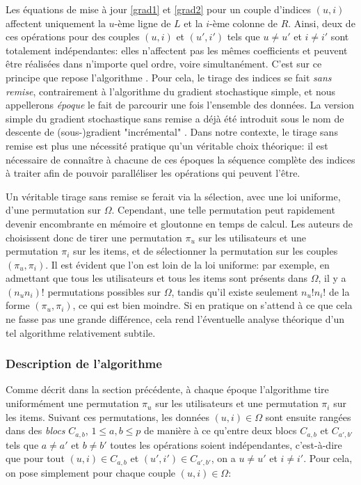 \documentclass[10pt,a4paper]{article}
\begin{document}
Les équations de mise à jour \eqref{grad1} et \eqref{grad2} pour un couple d'indices $(u,i)$ affectent uniquement la $u$-ème ligne de $L$ et la $i$-ème colonne de $R$. Ainsi, deux de ces opérations pour des couples $(u,i)$ et $(u',i')$ tels que $u \neq u'$ et $i \neq i'$ sont totalement indépendantes: elles n'affectent pas les mêmes coefficients et peuvent être réalisées dans n'importe quel ordre, voire simultanément. C'est sur ce principe que repose l'algorithme \jel \cite{jelly}. Pour cela, le tirage des indices se fait \emph{sans remise}, contrairement à l'algorithme du gradient stochastique simple, et nous appellerons \emph{époque} le fait de parcourir une fois l'ensemble des données. La version simple du gradient stochastique sans remise a déjà été introduit sous le nom de descente de (sous-)gradient "incrémental" \cite{nedic_base}. Dans notre contexte, le tirage sans remise est plus une nécessité pratique qu'un véritable choix théorique: il est nécessaire de connaître à chacune de ces époques la séquence complète des indices à traiter afin de pouvoir paralléliser les opérations qui peuvent l'être.

Un véritable tirage sans remise se ferait via la sélection, avec une loi uniforme, d'une permutation sur $\Omega$. Cependant, une telle permutation peut rapidement devenir encombrante en mémoire et gloutonne en temps de calcul. Les auteurs de \jel  choisissent donc de tirer une permutation $\pi_u$ sur les utilisateurs et une permutation $\pi_i$ sur les items, et de sélectionner la permutation sur les couples $(\pi_u,\pi_i)$. Il est évident que l'on est loin de la loi uniforme: par exemple, en admettant que tous les utilisateurs et tous les items sont présents dans $\Omega$, il y a $(n_un_i)!$ permutations possibles sur $\Omega$, tandis qu'il existe seulement $n_u!n_i!$ de la forme $(\pi_u,\pi_i)$, ce qui est bien moindre. Si en pratique on s'attend à ce que cela ne fasse pas une grande différence, cela rend l'éventuelle analyse théorique d'un tel algorithme relativement subtile.

\subsubsection*{Description de l'algorithme}

Comme décrit dans la section précédente, à chaque époque l'algorithme tire uniformément une permutation $\pi_u$ sur les utilisateurs et une permutation $\pi_i$ sur les items. Suivant ces permutations, les données $(u,i) \in \Omega$ sont ensuite rangées dans des \emph{blocs} $C_{a,b}$, $1 \leq a,b \leq p$ de manière à ce qu'entre deux blocs $C_{a,b}$ et $C_{a',b'}$ tels que $a \neq a'$ et $b \neq b'$ toutes les opérations soient indépendantes, c'est-à-dire que pour tout $(u,i) \in C_{a,b}$ et $(u',i') \in C_{a',b'}$, on a $u \neq u'$ et $i \neq i'$. Pour cela, on pose simplement pour chaque couple $(u,i) \in \Omega$:
\end{document}
